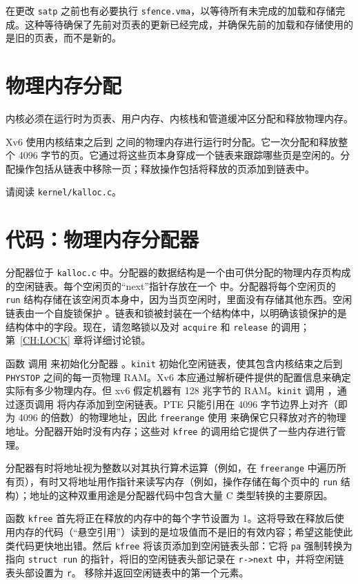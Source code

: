 在更改 \texttt{satp} 之前也有必要执行 \texttt{sfence.vma}，以等待所有未完成的加载和存储完成。这种等待确保了先前对页表的更新已经完成，并确保先前的加载和存储使用的是旧的页表，而不是新的。

\section{物理内存分配}
内核必须在运行时为页表、用户内存、内核栈和管道缓冲区分配和释放物理内存。

Xv6 使用内核结束之后到  之间的物理内存进行运行时分配。它一次分配和释放整个 4096 字节的页。它通过将这些页本身穿成一个链表来跟踪哪些页是空闲的。分配操作包括从链表中移除一页；释放操作包括将释放的页添加到链表中。

请阅读 {\tt kernel/kalloc.c}。

\section{代码：物理内存分配器}
分配器位于 {\tt kalloc.c}  中。分配器的数据结构是一个由可供分配的物理内存页构成的空闲链表。每个空闲页的“next”指针存放在一个   中。分配器将每个空闲页的 \lstinline{run} 结构存储在该空闲页本身中，因为当页空闲时，里面没有存储其他东西。空闲链表由一个自旋锁保护 。链表和锁被封装在一个结构体中，以明确该锁保护的是结构体中的字段。现在，请忽略锁以及对 \lstinline{acquire} 和 \lstinline{release} 的调用；第~\ref{CH:LOCK} 章将详细讨论锁。

函数  调用  来初始化分配器 。\lstinline{kinit} 初始化空闲链表，使其包含内核结束之后到 {\tt PHYSTOP} 之间的每一页物理 RAM。Xv6 本应通过解析硬件提供的配置信息来确定实际有多少物理内存。但 xv6 假定机器有 128 兆字节的 RAM。\lstinline{kinit} 调用 ，通过逐页调用  将内存添加到空闲链表。PTE 只能引用在 4096 字节边界上对齐（即为 4096 的倍数）的物理地址，因此 \lstinline{freerange} 使用  来确保它只释放对齐的物理地址。分配器开始时没有内存；这些对 \lstinline{kfree} 的调用给它提供了一些内存进行管理。

分配器有时将地址视为整数以对其执行算术运算（例如，在 \lstinline{freerange} 中遍历所有页），有时又将地址用作指针来读写内存（例如，操作存储在每个页中的 \lstinline{run} 结构）；地址的这种双重用途是分配器代码中包含大量 C 类型转换的主要原因。

函数 \lstinline{kfree}  首先将正在释放的内存中的每个字节设置为 1。这将导致在释放后使用内存的代码（“悬空引用”）读到的是垃圾值而不是旧的有效内容；希望这能使此类代码更快地出错。然后 \lstinline{kfree} 将该页添加到空闲链表头部：它将 \lstinline{pa} 强制转换为指向 \lstinline{struct run} 的指针，将旧的空闲链表头部记录在 \lstinline{r->next} 中，并将空闲链表头部设置为 \lstinline{r}。 移除并返回空闲链表中的第一个元素。

